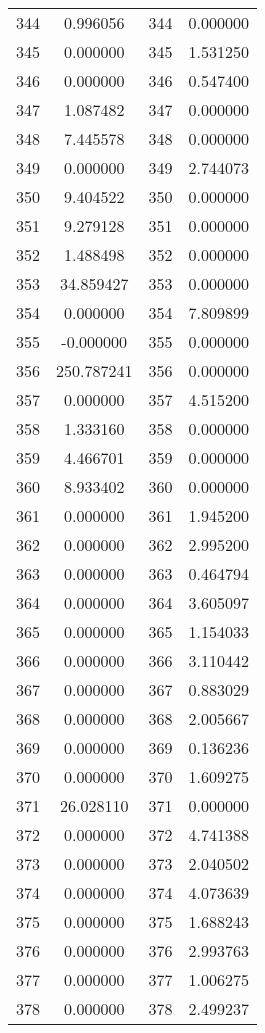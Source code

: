 \documentclass[12pt]{article}
\begin{document}
\begin{longtable}{@{}cccc@{}}
344 & 0.996056 & 344 & 0.000000 \\
345 & 0.000000 & 345 & 1.531250 \\
346 & 0.000000 & 346 & 0.547400 \\
347 & 1.087482 & 347 & 0.000000 \\
348 & 7.445578 & 348 & 0.000000 \\
349 & 0.000000 & 349 & 2.744073 \\
350 & 9.404522 & 350 & 0.000000 \\
351 & 9.279128 & 351 & 0.000000 \\
352 & 1.488498 & 352 & 0.000000 \\
353 & 34.859427 & 353 & 0.000000 \\
354 & 0.000000 & 354 & 7.809899 \\
355 & -0.000000 & 355 & 0.000000 \\
356 & 250.787241 & 356 & 0.000000 \\
357 & 0.000000 & 357 & 4.515200 \\
358 & 1.333160 & 358 & 0.000000 \\
359 & 4.466701 & 359 & 0.000000 \\
360 & 8.933402 & 360 & 0.000000 \\
361 & 0.000000 & 361 & 1.945200 \\
362 & 0.000000 & 362 & 2.995200 \\
363 & 0.000000 & 363 & 0.464794 \\
364 & 0.000000 & 364 & 3.605097 \\
365 & 0.000000 & 365 & 1.154033 \\
366 & 0.000000 & 366 & 3.110442 \\
367 & 0.000000 & 367 & 0.883029 \\
368 & 0.000000 & 368 & 2.005667 \\
369 & 0.000000 & 369 & 0.136236 \\
370 & 0.000000 & 370 & 1.609275 \\
371 & 26.028110 & 371 & 0.000000 \\
372 & 0.000000 & 372 & 4.741388 \\
373 & 0.000000 & 373 & 2.040502 \\
374 & 0.000000 & 374 & 4.073639 \\
375 & 0.000000 & 375 & 1.688243 \\
376 & 0.000000 & 376 & 2.993763 \\
377 & 0.000000 & 377 & 1.006275 \\
378 & 0.000000 & 378 & 2.499237 \\

\end{longtable}
\end{document}
